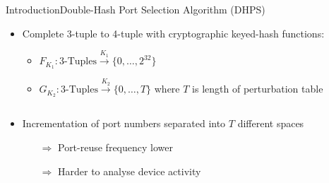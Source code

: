 \documentclass[aspectratio=169, hyperref={colorlinks=true, allcolors=SecondaryColor}, c]{beamer}
\begin{document}
	\begin{frame}[fragile]{Introduction}{Double-Hash Port Selection Algorithm (DHPS)}
		\begin{itemize}
			\item \alert{Complete 3-tuple to 4-tuple} with cryptographic keyed-hash functions:
			\begin{itemize}
				\scriptsize
				\item \( F_{K_1}: \text{3-Tuples} \xrightarrow{K_1} \{0, \ldots, 2^{32}\}\)
				\item \( G_{K_2}: \text{3-Tuples} \xrightarrow{K_2} \{0, \ldots, T\}\) where $T$ is length of \alert{perturbation table}
			\end{itemize}
		\end{itemize}
		\begin{columns}
			\begin{column}{0.5\textwidth}
				\begin{itemize}
					\item Incrementation of port numbers separated into \alert{$T$ different spaces}
					\begin{itemize}
						\item[\alert{$\Rightarrow$}] Port-reuse frequency lower %
						\item[\alert{$\Rightarrow$}] Harder to analyse device activity %
					\end{itemize}
				\end{itemize}
			\end{column}
			\begin{column}{0.5\textwidth}
				\begin{center}
					\begin{adjustbox}{max width=\textwidth}
					\end{adjustbox}
				\end{center}
			\end{column}
		\end{columns}
	\end{frame}
\end{document}
